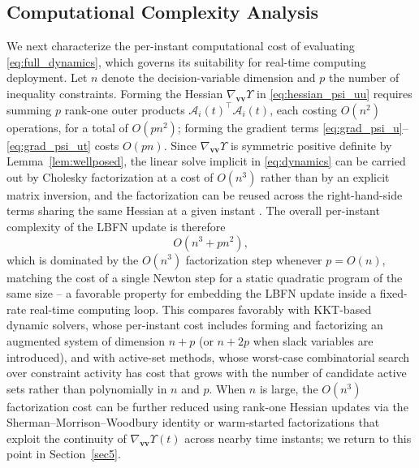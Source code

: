 \documentclass[pdflatex,sn-mathphys,Numbered]{sn-jnl}
\theoremstyle{thmstyleone}
\theoremstyle{thmstyletwo}
\theoremstyle{thmstylethree}
\begin{document}
\subsection{Computational Complexity Analysis}\label{subsec31}
We next characterize the per-instant computational cost of evaluating \eqref{eq:full_dynamics}, which governs its suitability for real-time computing deployment. Let $n$ denote the decision-variable dimension and $p$ the number of inequality constraints. Forming the Hessian $\nabla_{\bm{vv}}\Upsilon$ in \eqref{eq:hessian_psi_uu} requires summing $p$ rank-one outer products $\mathcal{A}_i(t)^\top\mathcal{A}_i(t)$, each costing $O(n^2)$ operations, for a total of $O(pn^2)$; forming the gradient terms \eqref{eq:grad_psi_u}--\eqref{eq:grad_psi_ut} costs $O(pn)$. Since $\nabla_{\bm{vv}}\Upsilon$ is symmetric positive definite by Lemma~\ref{lem:wellposed}, the linear solve implicit in \eqref{eq:dynamics} can be carried out by Cholesky factorization at a cost of $O(n^3)$ rather than by an explicit matrix inversion, and the factorization can be reused across the right-hand-side terms sharing the same Hessian at a given instant \cite{book12}. The overall per-instant complexity of the LBFN update is therefore
\begin{equation}
O(n^3 + pn^2),
\label{eq:complexity}
\end{equation}
which is dominated by the $O(n^3)$ factorization step whenever $p=O(n)$, matching the cost of a single Newton step for a static quadratic program of the same size -- a favorable property for embedding the LBFN update inside a fixed-rate real-time computing loop. This compares favorably with KKT-based dynamic solvers, whose per-instant cost includes forming and factorizing an augmented system of dimension $n+p$ (or $n+2p$ when slack variables are introduced), and with active-set methods, whose worst-case combinatorial search over constraint activity has cost that grows with the number of candidate active sets rather than polynomially in $n$ and $p$. When $n$ is large, the $O(n^3)$ factorization cost can be further reduced using rank-one Hessian updates via the Sherman--Morrison--Woodbury identity or warm-started factorizations that exploit the continuity of $\nabla_{\bm{vv}}\Upsilon(t)$ across nearby time instants; we return to this point in Section~\ref{sec5}.
\end{document}
